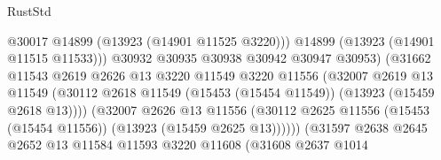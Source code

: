 \begin{lexlean}{RustStd}
\begin{coremodule}
                                              @30017
                                              @14899
                                              (@13923 (@14901 @11525 @3220)))
                                            @14899
                                            (@13923 (@14901 @11515 @11533)))
                                          @30932
                                          @30935
                                          @30938
                                          @30942
                                          @30947
                                          @30953)
                                        (@31662
                                          @11543
                                          @2619
                                          @2626
                                          @13
                                          @3220
                                          @11549
                                          @3220
                                          @11556
                                          (@32007
                                            @2619
                                            @13
                                            @11549
                                            (@30112
                                              @2618
                                              @11549
                                              (@15453 (@15454 @11549))
                                              (@13923 (@15459 @2618 @13))))
                                          (@32007
                                            @2626
                                            @13
                                            @11556
                                            (@30112
                                              @2625
                                              @11556
                                              (@15453 (@15454 @11556))
                                              (@13923 (@15459 @2625 @13))))))
                                      (@31597
                                        @2638
                                        @2645
                                        @2652
                                        @13
                                        @11584
                                        @11593
                                        @3220
                                        @11608
                                        (@31608
                                          @2637
                                          @1014

\end{coremodule}
\end{lexlean}
